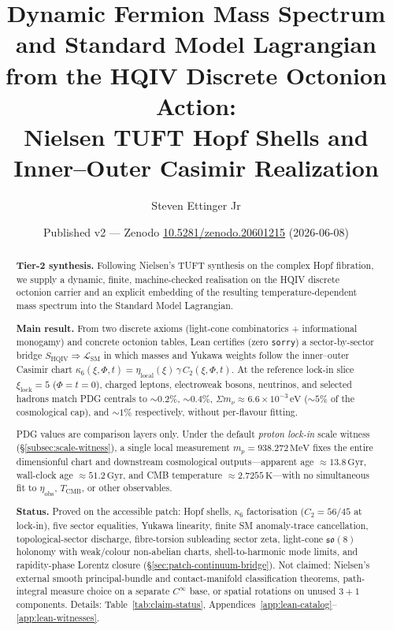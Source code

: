 \documentclass[11pt]{amsart}
\title[Mass Spectrum and SM Lagrangian from HQIV Discrete Action]
{Dynamic Fermion Mass Spectrum and Standard Model Lagrangian\\
from the HQIV Discrete Octonion Action:\\
Nielsen TUFT Hopf Shells and Inner--Outer Casimir Realization}
\author{Steven Ettinger Jr}
\date{Published v2 --- Zenodo \href{https://doi.org/10.5281/zenodo.20601215}{10.5281/zenodo.20601215} (2026-06-08)}
\begin{document}
\begin{abstract}
\noindent\textbf{Tier-2 synthesis.} Following Nielsen's TUFT synthesis on the complex Hopf fibration, we supply a dynamic, finite, machine-checked realisation on the HQIV discrete octonion carrier and an explicit embedding of the resulting temperature-dependent mass spectrum into the Standard Model Lagrangian.

\noindent\textbf{Main result.} From two discrete axioms (light-cone combinatorics + informational monogamy) and concrete octonion tables, Lean certifies (zero \texttt{sorry}) a sector-by-sector bridge $S_{\mathrm{HQIV}}\Rightarrow \mathcal{L}_{\mathrm{SM}}$ in which masses and Yukawa weights follow the inner--outer Casimir chart $\kappa_6(\xi,\Phi,t)=\eta_{\mathrm{local}}(\xi)\,\gamma\,C_2(\xi,\Phi,t)$. At the reference lock-in slice $\xi_{\mathrm{lock}}=5$ ($\Phi=t=0$), charged leptons, electroweak bosons, neutrinos, and selected hadrons match PDG centrals to $\sim 0.2\%$, $\sim 0.4\%$, $\Sigma m_\nu \approx 6.6\times 10^{-3}\,\mathrm{eV}$ ($\sim 5\%$ of the cosmological cap), and $\sim 1\%$ respectively, without per-flavour fitting.

\noindent PDG values \cite{pdg2024} are comparison layers only. Under the default \emph{proton lock-in} scale witness (\S\ref{subsec:scale-witness}), a single local measurement $m_p=938.272\,\mathrm{MeV}$ fixes the entire dimensionful chart and downstream cosmological outputs---apparent age $\approx 13.8\,\mathrm{Gyr}$, wall-clock age $\approx 51.2\,\mathrm{Gyr}$, and CMB temperature $\approx 2.7255\,\mathrm{K}$---with no simultaneous fit to $\eta_{\mathrm{obs}}$, $T_{\mathrm{CMB}}$, or other observables.

\noindent\textbf{Status.} Proved on the accessible patch: Hopf shells, $\kappa_6$ factorisation ($C_2=56/45$ at lock-in), five sector equalities, Yukawa linearity, finite SM anomaly-trace cancellation, topological-sector discharge, fibre-torsion subleading sector zeta, light-cone $\mathfrak{so}(8)$ holonomy with weak/colour non-abelian charts, shell-to-harmonic mode limits, and rapidity-phase Lorentz closure (§\ref{sec:patch-continuum-bridge}). Not claimed: Nielsen's external smooth principal-bundle and contact-manifold classification theorems, path-integral measure choice on a separate $C^\infty$ base, or spatial rotations on unused $3{+}1$ components. Details: Table~\ref{tab:claim-status}, Appendices~\ref{app:lean-catalog}--\ref{app:lean-witnesses}.
\end{abstract}
\maketitle
\end{document}
